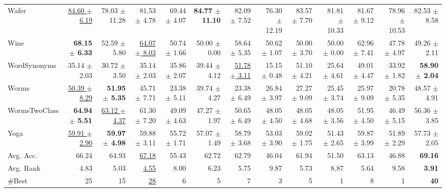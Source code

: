 \begin{landscape}
\begin{longtable}{lrrrrrrrrrrrr}
Wafer & \underline{84.60 $\pm$ 6.19} & 78.03 $\pm$ 11.28 & 81.53 $\pm$ 4.78 & 69.44 $\pm$ 4.07 & \textbf{84.77 $\pm$ 11.10} & 82.09 $\pm$ 7.52 & 76.30 $\pm$ 12.19 & 83.57 $\pm$ 7.70 & 81.81 $\pm$ 10.33 & 81.67 $\pm$ 9.12 & 78.96 $\pm$ 10.53 & 82.53 $\pm$ 8.58 \\
Wine & \textbf{68.15 $\pm$ 6.33} & 52.59 $\pm$ 5.80 & \underline{64.07 $\pm$ 8.03} & 50.74 $\pm$ 1.66 & 50.00 $\pm$ 0.00 & 58.64 $\pm$ 5.35 & 50.62 $\pm$ 1.07 & 50.00 $\pm$ 3.70 & 50.00 $\pm$ 0.00 & 62.96 $\pm$ 7.41 & 47.78 $\pm$ 4.97 & 49.26 $\pm$ 2.11 \\
WordSynonyms & 35.14 $\pm$ 2.03 & 30.72 $\pm$ 3.50 & 35.14 $\pm$ 2.03 & 35.86 $\pm$ 2.07 & 39.44 $\pm$ 4.12 & \underline{51.78 $\pm$ 3.11} & 15.15 $\pm$ 0.48 & 51.10 $\pm$ 4.21 & 25.64 $\pm$ 4.61 & 49.01 $\pm$ 4.47 & 33.92 $\pm$ 1.82 & \textbf{58.90 $\pm$ 2.04} \\
Worms & \underline{50.39 $\pm$ 8.29} & \textbf{51.95 $\pm$ 5.35} & 45.71 $\pm$ 7.71 & 23.38 $\pm$ 5.11 & 39.74 $\pm$ 4.27 & 23.38 $\pm$ 6.49 & 26.84 $\pm$ 3.97 & 27.27 $\pm$ 9.09 & 25.45 $\pm$ 3.74 & 25.97 $\pm$ 9.09 & 20.78 $\pm$ 5.35 & 48.57 $\pm$ 4.91 \\
WormsTwoClass & \textbf{64.94 $\pm$ 5.51} & \underline{63.12 $\pm$ 4.37} & 61.30 $\pm$ 7.20 & 49.09 $\pm$ 4.63 & 47.27 $\pm$ 1.97 & 50.65 $\pm$ 6.49 & 48.05 $\pm$ 4.50 & 48.05 $\pm$ 4.68 & 48.05 $\pm$ 3.56 & 51.95 $\pm$ 4.50 & 46.49 $\pm$ 5.15 & 56.36 $\pm$ 3.85 \\
Yoga & \underline{59.91 $\pm$ 2.90} & \textbf{59.97 $\pm$ 4.98} & 59.88 $\pm$ 3.11 & 55.72 $\pm$ 1.71 & 57.07 $\pm$ 1.49 & 58.79 $\pm$ 3.68 & 53.03 $\pm$ 3.90 & 59.02 $\pm$ 1.75 & 51.43 $\pm$ 2.65 & 59.87 $\pm$ 3.99 & 51.89 $\pm$ 2.29 & 57.73 $\pm$ 2.05 \\
\midrule
Avg. Acc. & 66.24 & 64.93 & \underline{67.18} & 55.43 & 62.72 & 62.79 & 46.04 & 61.94 & 51.50 & 63.13 & 46.88 & \textbf{69.16} \\
Avg. Rank & 4.83 & 5.03 & \underline{4.55} & 8.00 & 6.23 & 5.75 & 9.87 & 5.73 & 8.87 & 5.64 & 9.58 & \textbf{3.91} \\
\#Best & 25 & 15 & \underline{28} & 6 & 5 & 7 & 3 & 5 & 1 & 8 & 1 & \textbf{40} \\
\end{longtable}
\endgroup
\end{landscape}
